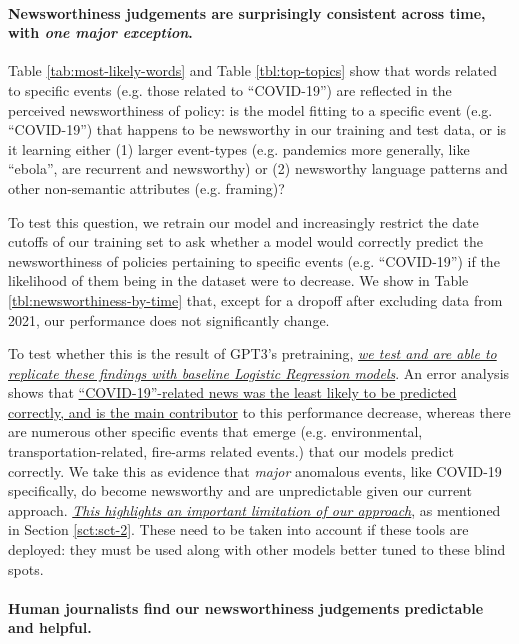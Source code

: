 \documentclass[11pt]{article}
\begin{document}
\paragraph{Newsworthiness judgements are surprisingly consistent across time, with \textit{one major exception}.}
Table \ref{tab:most-likely-words} and Table \ref{tbl:top-topics} show that words related to specific events (e.g. those related to ``COVID-19'') are reflected in the perceived newsworthiness of policy: is the model fitting to a specific event (e.g. ``COVID-19'') that happens to be newsworthy in our training and test data, or is it learning  either (1) larger event-types (e.g. pandemics more generally,  like ``ebola'', are recurrent and newsworthy) or (2) newsworthy language patterns and other non-semantic attributes (e.g. framing)? 

To test this question, we retrain our model and increasingly restrict the date cutoffs of our training set to ask whether a model would correctly predict the newsworthiness of policies pertaining to specific events (e.g. ``COVID-19'') if the likelihood of them being in the dataset were to decrease. We show in Table \ref{tbl:newsworthiness-by-time} that, except for a dropoff after excluding data from 2021, our performance does not significantly change. 

To test whether this is the result of GPT3's pretraining, \textit{\ul{we test and are able to replicate these findings with baseline Logistic Regression models}}. An error analysis shows that \ul{``COVID-19''-related news was the least likely to be predicted correctly, and is the main contributor} to this performance decrease, whereas there are numerous other specific events that emerge (e.g. environmental, transportation-related, fire-arms related events.) that our models predict correctly. We take this as evidence that \textit{major} anomalous events, like COVID-19 specifically, do become newsworthy and are unpredictable given our current approach. \textit{\ul{This highlights an important limitation of our approach}}, as mentioned in Section \ref{sct:sct-2}. These need to be taken into account if these tools are deployed: they must be used along with other models better tuned to these blind spots. 

\paragraph{Human journalists find our newsworthiness judgements predictable and helpful.}
\end{document}
